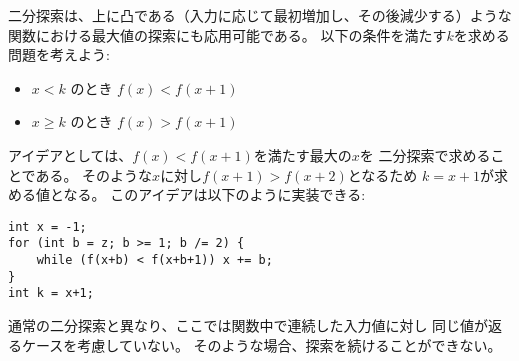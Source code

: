 二分探索は、上に凸である（入力に応じて最初増加し、その後減少する）ような
関数における最大値の探索にも応用可能である。
以下の条件を満たす$k$を求める問題を考えよう:

\begin{itemize}
\item
$x<k$ のとき $f(x)<f(x+1)$
\item
$x \ge k$ のとき $f(x)>f(x+1)$
\end{itemize}

\begin{comment}
The idea is to use binary search
for finding the largest value of $x$
for which $f(x)<f(x+1)$.
This implies that $k=x+1$
because $f(x+1)>f(x+2)$.
The following code implements the search: 
\end{comment}

アイデアとしては、$f(x)<f(x+1)$を満たす最大の$x$を
二分探索で求めることである。
そのような$x$に対し$f(x+1)>f(x+2)$となるため
$k=x+1$が求める値となる。
このアイデアは以下のように実装できる:

\begin{lstlisting}
int x = -1;
for (int b = z; b >= 1; b /= 2) {
    while (f(x+b) < f(x+b+1)) x += b;
}
int k = x+1;
\end{lstlisting}

\begin{comment}
Note that unlike in the ordinary binary search,
here it is not allowed that consecutive values
of the function are equal.
In this case it would not be possible to know
how to continue the search.
\end{comment}

通常の二分探索と異なり、ここでは関数中で連続した入力値に対し
同じ値が返るケースを考慮していない。
そのような場合、探索を続けることができない。
